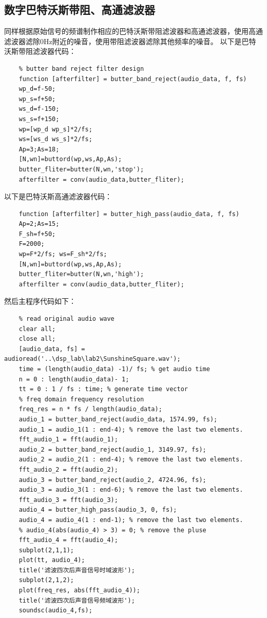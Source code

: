\documentclass[UTF8]{ctexart}
\begin{document}
\subsection{数字巴特沃斯带阻、高通滤波器}
同样根据原始信号的频谱制作相应的巴特沃斯带阻滤波器和高通滤波器，使用高通滤波器滤除0Hz附近的噪音，使用带阻滤波器滤除其他频率的噪音。
以下是巴特沃斯带阻滤波器代码：
\begin{verbatim}
    % butter band reject filter design
    function [afterfilter] = butter_band_reject(audio_data, f, fs)
    wp_d=f-50;
    wp_s=f+50;
    ws_d=f-150;
    ws_s=f+150;
    wp=[wp_d wp_s]*2/fs; 
    ws=[ws_d ws_s]*2/fs;
    Ap=3;As=18;
    [N,wn]=buttord(wp,ws,Ap,As);
    butter_fliter=butter(N,wn,'stop');
    afterfilter = conv(audio_data,butter_fliter);
\end{verbatim}
以下是巴特沃斯高通滤波器代码：
\begin{verbatim}
    function [afterfilter] = butter_high_pass(audio_data, f, fs)
    Ap=2;As=15;
    F_sh=f+50;
    F=2000;
    wp=F*2/fs; ws=F_sh*2/fs;
    [N,wn]=buttord(wp,ws,Ap,As);
    butter_fliter=butter(N,wn,'high');
    afterfilter = conv(audio_data,butter_fliter);
\end{verbatim}
然后主程序代码如下：
\begin{verbatim}
    % read original audio wave
    clear all;
    close all;
    [audio_data, fs] = audioread('..\dsp_lab\lab2\SunshineSquare.wav');
    time = (length(audio_data) -1)/ fs; % get audio time
    n = 0 : length(audio_data)- 1;
    tt = 0 : 1 / fs : time; % generate time vector
    % freq domain frequency resolution
    freq_res = n * fs / length(audio_data);
    audio_1 = butter_band_reject(audio_data, 1574.99, fs);
    audio_1 = audio_1(1 : end-4); % remove the last two elements.
    fft_audio_1 = fft(audio_1);
    audio_2 = butter_band_reject(audio_1, 3149.97, fs);
    audio_2 = audio_2(1 : end-4); % remove the last two elements.
    fft_audio_2 = fft(audio_2);
    audio_3 = butter_band_reject(audio_2, 4724.96, fs);
    audio_3 = audio_3(1 : end-6); % remove the last two elements.
    fft_audio_3 = fft(audio_3);
    audio_4 = butter_high_pass(audio_3, 0, fs);
    audio_4 = audio_4(1 : end-1); % remove the last two elements.
    % audio_4(abs(audio_4) > 3) = 0; % remove the pluse
    fft_audio_4 = fft(audio_4);
    subplot(2,1,1);
    plot(tt, audio_4);
    title('滤波四次后声音信号时域波形');
    subplot(2,1,2);
    plot(freq_res, abs(fft_audio_4));
    title('滤波四次后声音信号频域波形');
    soundsc(audio_4,fs);
\end{verbatim}
\end{document}
